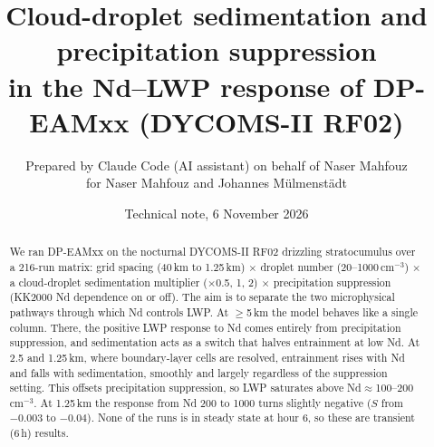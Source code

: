 \documentclass[10pt]{article}
\title{\bfseries Cloud-droplet sedimentation and precipitation suppression\\ in the Nd--LWP response of DP-EAMxx (DYCOMS-II RF02)}
\author{Prepared by Claude Code (AI assistant) on behalf of Naser Mahfouz\\ for Naser Mahfouz and Johannes M\"ulmenst\"adt}
\date{Technical note, 6 November 2026}
\begin{document}
\sloppy
\maketitle

\begin{abstract}\noindent
We ran DP-EAMxx on the nocturnal DYCOMS-II RF02 drizzling stratocumulus over a 216-run matrix:
grid spacing (40\,km to 1.25\,km) $\times$ droplet number (20--1000\,cm$^{-3}$) $\times$ a cloud-droplet sedimentation multiplier
($\times$0.5, 1, 2) $\times$ precipitation suppression (KK2000 Nd dependence on or off).
The aim is to separate the two microphysical pathways through which Nd controls LWP.
At $\geq$5\,km the model behaves like a single column. There, the positive LWP response to Nd comes entirely from precipitation suppression, and sedimentation acts as a switch
that halves entrainment at low Nd. At 2.5 and 1.25\,km, where boundary-layer cells are resolved, entrainment rises with Nd and falls with sedimentation, smoothly and largely
regardless of the suppression setting. This offsets precipitation suppression, so LWP saturates above Nd$\approx$100--200\,cm$^{-3}$.
At 1.25\,km the response from Nd 200 to 1000 turns slightly negative ($S$ from $-0.003$ to $-0.04$).
None of the runs is in steady state at hour 6, so these are transient (6\,h) results.
\end{abstract}
\end{document}
